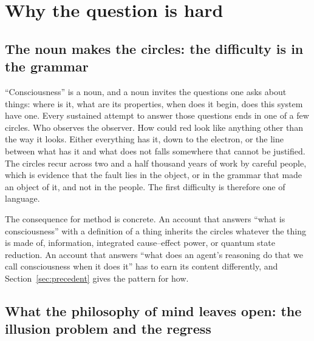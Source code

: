 \section{Why the question is hard}
\label{sec:difficulties}

\subsection{The noun makes the circles: the difficulty is in the grammar}
\label{sec:grammar}

``Consciousness'' is a noun, and a noun invites the questions one asks about things: where is it, what
are its properties, when does it begin, does this system have one. Every sustained attempt to answer
those questions ends in one of a few circles. Who observes the observer. How could red look like
anything other than the way it looks. Either everything has it, down to the electron, or the line
between what has it and what does not falls somewhere that cannot be justified. The circles recur
across two and a half thousand years of work by careful people, which is evidence that the fault lies
in the object, or in the grammar that made an object of it, and not in the people. The first difficulty
is therefore one of language.

The consequence for method is concrete. An account that answers ``what is consciousness'' with a
definition of a thing inherits the circles whatever the thing is made of, information, integrated
cause--effect power, or quantum state reduction. An account that answers ``what does an agent's
reasoning do that we call consciousness when it does it'' has to earn its content differently, and
Section~\ref{sec:precedent} gives the pattern for how.

\subsection{What the philosophy of mind leaves open: the illusion problem and the regress}
\label{sec:legacy}

